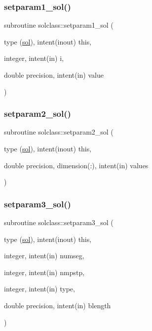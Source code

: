 \mbox{\label{namespacesolclass_aaec011d4f25d3b03a7e0b42beaa7c9db}} 
\subsubsection{\texorpdfstring{setparam1\_sol()}{setparam1\_sol()}}
{\footnotesize\ttfamily subroutine solclass\+::setparam1\+\_\+sol (\begin{DoxyParamCaption}\item[{type (\mbox{\hyperlink{namespacesolclass_structsolclass_1_1sol}{sol}}), intent(inout)}]{this,  }\item[{integer, intent(in)}]{i,  }\item[{double precision, intent(in)}]{value }\end{DoxyParamCaption})}

\mbox{\label{namespacesolclass_a8f2eac99c954759e1b3b6094d8f502fb}} 
\subsubsection{\texorpdfstring{setparam2\_sol()}{setparam2\_sol()}}
{\footnotesize\ttfamily subroutine solclass\+::setparam2\+\_\+sol (\begin{DoxyParamCaption}\item[{type (\mbox{\hyperlink{namespacesolclass_structsolclass_1_1sol}{sol}}), intent(inout)}]{this,  }\item[{double precision, dimension(\+:), intent(in)}]{values }\end{DoxyParamCaption})}

\mbox{\label{namespacesolclass_a05dc05d4a94a2e1a71280ff983e62c3e}} 
\subsubsection{\texorpdfstring{setparam3\_sol()}{setparam3\_sol()}}
{\footnotesize\ttfamily subroutine solclass\+::setparam3\+\_\+sol (\begin{DoxyParamCaption}\item[{type (\mbox{\hyperlink{namespacesolclass_structsolclass_1_1sol}{sol}}), intent(inout)}]{this,  }\item[{integer, intent(in)}]{numseg,  }\item[{integer, intent(in)}]{nmpstp,  }\item[{integer, intent(in)}]{type,  }\item[{double precision, intent(in)}]{blength }\end{DoxyParamCaption})}



